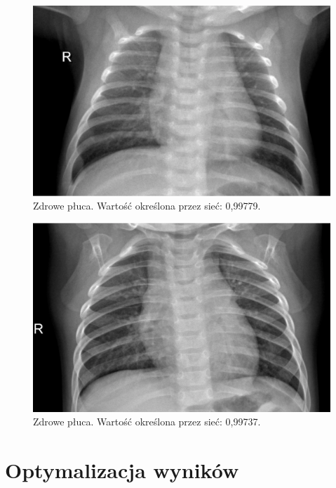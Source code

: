 \documentclass[12pt,a4paper,twoside,titlepage,openright]{book}
\begin{document}
\begin{figure}[ht]
	\centering
			\includegraphics[resolution=100, scale=0.3]{randomUncertain1.png}
		\caption{Zdrowe płuca. Wartość określona przez sieć: 0,99779.}
				\label{fig:randomUncertain1}
\end{figure}

\begin{figure}[ht]
	\centering
			\includegraphics[resolution=100, scale=0.3]{randomUncertain2.png}
		\caption{Zdrowe płuca. Wartość określona przez sieć: 0,99737.}
				\label{fig:randomUncertain2}
\end{figure}


\section{Optymalizacja wyników}
\end{document}
